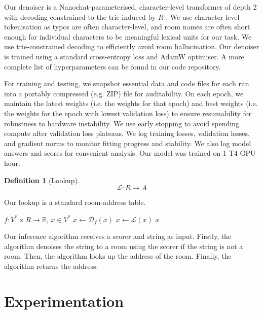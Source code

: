 \documentclass{article}
\theoremstyle{definition}
\newtheorem{definition}{Definition}
\newcommand{\R}{\mathbb{R}}
\begin{document}
Our denoiser is a Nanochat-parameterised, character-level transformer of depth 2 with decoding constrained to the trie induced by $R$
\citep{nanochat}.
We use character-level tokenisation as typos are often character-level, and room names are often short enough for individual characters to be meaningful lexical units for our task.
We use trie-constrained decoding to efficiently avoid room hallucination.
Our denoiser is trained using a standard cross-entropy loss and AdamW optimiser.
A more complete list of hyperparameters can be found in our code repository.

For training and testing, we snapshot essential data and code files for each run into a portably compressed (e.g. ZIP) file for auditability.
On each epoch, we maintain the latest weights (i.e. the weights for that epoch) and best weights (i.e. the weights for the epoch with lowest validation loss) to ensure resumability for robustness to hardware instability.
We use early stopping to avoid spending compute after validation loss plateaus.
We log training losses, validation losses, and gradient norms to monitor fitting progress and stability.
We also log model answers and scores for convenient analysis.
Our model was trained on 1 T4 GPU hour.

\begin{definition}[Lookup]
$$
	\mathscr{L}:R\to A
$$
\end{definition}

Our lookup is a standard room-address table.

\begin{algorithm}[H]
	\caption{$\textsc{Infer}(f,x)$}
	\begin{algorithmic}
		\Require $f:V^{*}\times R\to\R$, $x\in V^{*}$
			$x\gets\mathscr{D}_{f}(x)$
		\EndIf
		\State $x\gets\mathscr{L}(x)$
		\State \Return $x$
	\end{algorithmic}
\end{algorithm}

Our inference algorithm receives a scorer and string as input.
Firstly, the algorithm denoises the string to a room using the scorer if the string is not a room.
Then, the algorithm looks up the address of the room.
Finally, the algorithm returns the address.

\newpage

\section{Experimentation}
\end{document}
